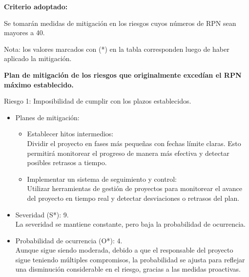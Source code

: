 \textbf{Criterio adoptado:}

Se tomarán medidas de mitigación en los riesgos cuyos números de RPN sean
mayores a 40.

Nota: los valores marcados con (*) en la tabla corresponden luego de haber
aplicado la mitigación.

\textbf{Plan de mitigación de los riesgos que originalmente excedían el RPN máximo
	establecido.}

Riesgo 1: Imposibilidad de cumplir con los plazos establecidos.
\begin{itemize}
	\item Planes de mitigación:\\
	      \begin{itemize}
		      \item Establecer hitos intermedios:\\ Dividir el proyecto en fases más pequeñas con
		            fechas límite claras. Esto permitirá monitorear el progreso de manera más
		            efectiva y detectar posibles retrasos a tiempo.
		      \item Implementar un sistema de seguimiento y control:\\ Utilizar herramientas de
		            gestión de proyectos para monitorear el avance del proyecto en tiempo real y
		            detectar desviaciones o retrasos del plan.
	      \end{itemize}
	\item Severidad (S*): 9.\\ La severidad se mantiene constante, pero baja la probabilidad de ocurrencia.
	\item Probabilidad de ocurrencia (O*): 4.\\ Aunque sigue siendo moderada, debido a que
	      el responsable del proyecto sigue teniendo múltiples compromisos, la
	      probabilidad se ajusta para reflejar una disminución considerable en el riesgo,
	      gracias a las medidas proactivas.
\end{itemize}

\pagebreak

